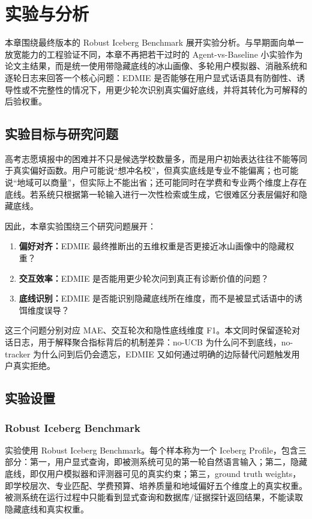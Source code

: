 \cleardoublepage
\section{实验与分析}

本章围绕最终版本的 Robust Iceberg Benchmark 展开实验分析。与早期面向单一放宽能力的工程验证不同，本章不再把若干过时的 Agent-vs-Baseline 小实验作为论文主结果，而是统一使用带隐藏底线的冰山画像、多轮用户模拟器、消融系统和逐轮日志来回答一个核心问题：EDMIE 是否能够在用户显式话语具有防御性、诱导性或不完整性的情况下，用更少轮次识别真实偏好底线，并将其转化为可解释的后验权重。

\subsection{实验目标与研究问题}

高考志愿填报中的困难并不只是候选学校数量多，而是用户初始表达往往不能等同于真实偏好函数。用户可能说“想冲名校”，但真实底线是专业不能偏离；也可能说“地域可以商量”，但实际上不能出省；还可能同时在学费和专业两个维度上存在底线。若系统只根据第一轮输入进行一次性检索或生成，它很难区分表层偏好和隐藏底线。

因此，本章实验围绕三个研究问题展开：

\begin{enumerate}[label=(\arabic*)]
    \item \textbf{偏好对齐：}EDMIE 最终推断出的五维权重是否更接近冰山画像中的隐藏权重？
    \item \textbf{交互效率：}EDMIE 是否能用更少轮次问到真正有诊断价值的问题？
    \item \textbf{底线识别：}EDMIE 是否能识别隐藏底线所在维度，而不是被显式话语中的诱饵维度误导？
\end{enumerate}

这三个问题分别对应 MAE、交互轮次和隐性底线维度 F1。本文同时保留逐轮对话日志，用于解释聚合指标背后的机制差异：no-UCB 为什么问不到底线，no-tracker 为什么问到后仍会遗忘，EDMIE 又如何通过明确的边际替代问题触发用户真实拒绝。

\subsection{实验设置}

\subsubsection{Robust Iceberg Benchmark}

实验使用 Robust Iceberg Benchmark。每个样本称为一个 Iceberg Profile，包含三部分：第一，用户显式查询，即被测系统可见的第一轮自然语言输入；第二，隐藏底线，即仅用户模拟器和评测器可见的真实约束；第三，ground truth weights，即学校层次、专业匹配、学费预算、培养质量和地域偏好五个维度上的真实权重。被测系统在运行过程中只能看到显式查询和数据库/证据探针返回结果，不能读取隐藏底线和真实权重。

